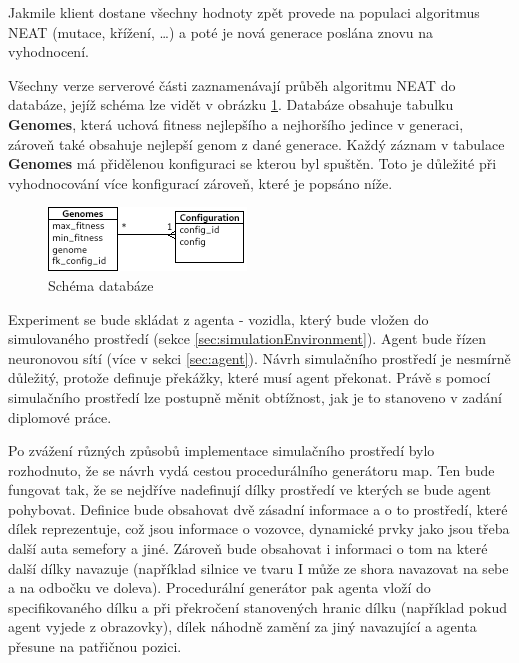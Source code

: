 Jakmile klient dostane všechny hodnoty zpět provede na populaci algoritmus NEAT (mutace, křížení, \dots) a poté je nová generace poslána znovu na vyhodnocení.

Všechny verze serverové části zaznamenávají průběh algoritmu NEAT do databáze, jejíž schéma lze vidět v obrázku \ref{fig:database}. Databáze obsahuje tabulku \textbf{Genomes}, která uchová fitness nejlepšího a nejhoršího jedince v generaci, zároveň také obsahuje nejlepší genom z dané generace. Každý záznam v tabulace \textbf{Genomes} má přidělenou konfiguraci se kterou byl spuštěn. Toto je důležité při vyhodnocování více konfigurací zároveň, které je popsáno níže.

\begin{figure}[H]
	\centering
	\includegraphics[width=0.7\linewidth]{ERD}
	\caption{Schéma databáze}
	\label{fig:database}
\end{figure}

Experiment se bude skládat z agenta - vozidla, který bude vložen do simulovaného prostředí (sekce \ref{sec:simulationEnvironment}). Agent bude řízen neuronovou sítí (více v sekci \ref{sec:agent}).
\label{sec:simulationRoadDirector}
Návrh simulačního prostředí je nesmírně důležitý, protože definuje překážky, které musí agent překonat. Právě s pomocí simulačního prostředí lze postupně měnit obtížnost, jak je to stanoveno v zadání diplomové práce.

Po zvážení různých způsobů implementace simulačního prostředí bylo rozhodnuto, že se návrh vydá cestou procedurálního generátoru map. 
Ten bude fungovat tak, že se nejdříve nadefinují dílky prostředí ve kterých se bude agent pohybovat. Definice bude obsahovat dvě zásadní informace a o to prostředí, které dílek reprezentuje, což jsou informace o vozovce, dynamické prvky jako jsou třeba další auta semefory a jiné. Zároveň bude obsahovat i informaci o tom na které další dílky navazuje (například silnice ve tvaru I může ze shora navazovat na sebe a na odbočku ve doleva). Procedurální generátor pak agenta vloží do specifikovaného dílku a při překročení stanovených hranic dílku (například pokud agent vyjede z obrazovky), dílek náhodně zamění za jiný navazující a agenta přesune na patřičnou pozici. 

